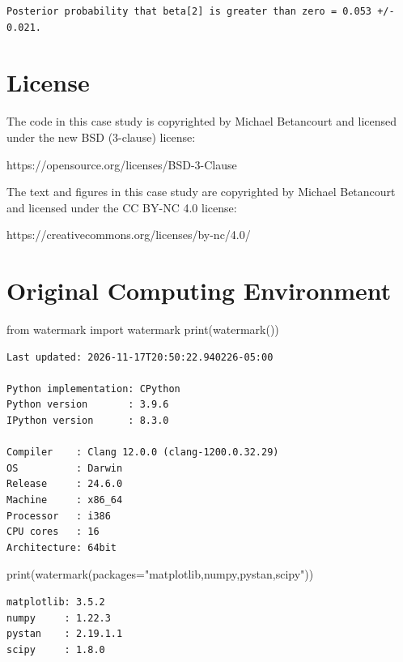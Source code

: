 \documentclass[
  letterpaper,
  DIV=11,
  numbers=noendperiod]{scrartcl}
\newenvironment{Shaded}{\begin{snugshade}}{\end{snugshade}}
\newcommand{\BuiltInTok}[1]{\textcolor[rgb]{0.00,0.23,0.31}{#1}}
\newcommand{\ImportTok}[1]{\textcolor[rgb]{0.00,0.46,0.62}{#1}}
\newcommand{\NormalTok}[1]{\textcolor[rgb]{0.00,0.23,0.31}{#1}}
\newcommand{\OperatorTok}[1]{\textcolor[rgb]{0.37,0.37,0.37}{#1}}
\newcommand{\StringTok}[1]{\textcolor[rgb]{0.13,0.47,0.30}{#1}}
\begin{document}
\begin{verbatim}
Posterior probability that beta[2] is greater than zero = 0.053 +/- 0.021.
\end{verbatim}

\section*{License}\label{license}

The code in this case study is copyrighted by Michael Betancourt and
licensed under the new BSD (3-clause) license:

https://opensource.org/licenses/BSD-3-Clause

The text and figures in this case study are copyrighted by Michael
Betancourt and licensed under the CC BY-NC 4.0 license:

https://creativecommons.org/licenses/by-nc/4.0/

\section*{Original Computing
Environment}\label{original-computing-environment}

\begin{Shaded}
\begin{Highlighting}[]
\ImportTok{from}\NormalTok{ watermark }\ImportTok{import}\NormalTok{ watermark}
\BuiltInTok{print}\NormalTok{(watermark())}
\end{Highlighting}
\end{Shaded}

\begin{verbatim}
Last updated: 2026-11-17T20:50:22.940226-05:00

Python implementation: CPython
Python version       : 3.9.6
IPython version      : 8.3.0

Compiler    : Clang 12.0.0 (clang-1200.0.32.29)
OS          : Darwin
Release     : 24.6.0
Machine     : x86_64
Processor   : i386
CPU cores   : 16
Architecture: 64bit
\end{verbatim}

\begin{Shaded}
\begin{Highlighting}[]
\BuiltInTok{print}\NormalTok{(watermark(packages}\OperatorTok{=}\StringTok{"matplotlib,numpy,pystan,scipy"}\NormalTok{))}
\end{Highlighting}
\end{Shaded}

\begin{verbatim}
matplotlib: 3.5.2
numpy     : 1.22.3
pystan    : 2.19.1.1
scipy     : 1.8.0
\end{verbatim}
\end{document}
